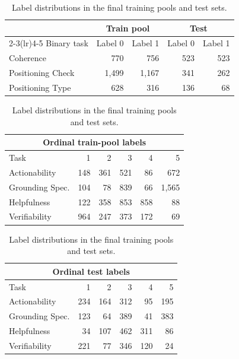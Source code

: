 \begin{table}[H]
\centering
\fontsize{9.5pt}{10.8pt}\selectfont
\renewcommand{\arraystretch}{0.92}
\setlength{\tabcolsep}{1.5pt}

\begin{tabular*}{\columnwidth}
  {@{\extracolsep{\fill}}lrrrr@{}}
\toprule
& \multicolumn{2}{c}{Train pool}
& \multicolumn{2}{c}{Test} \\
\cmidrule(lr){2-3}\cmidrule(lr){4-5}
Binary task & Label 0 & Label 1 & Label 0 & Label 1 \\
\midrule
Coherence & 770 & 756 & 523 & 523 \\
Positioning Check & 1,499 & 1,167 & 341 & 262 \\
Positioning Type & 628 & 316 & 136 & 68 \\
\bottomrule
\end{tabular*}

\vspace{3pt}
\begin{tabular*}{\columnwidth}
  {@{\extracolsep{\fill}}lrrrrr@{}}
\toprule
\multicolumn{6}{c}{\textbf{Ordinal train-pool labels}} \\
\midrule
Task & 1 & 2 & 3 & 4 & 5 \\
\midrule
Actionability & 148 & 361 & 521 & 86 & 672 \\
Grounding Spec. & 104 & 78 & 839 & 66 & 1,565 \\
Helpfulness & 122 & 358 & 853 & 858 & 88 \\
Verifiability & 964 & 247 & 373 & 172 & 69 \\
\bottomrule
\end{tabular*}

\vspace{3pt}
\begin{tabular*}{\columnwidth}
  {@{\extracolsep{\fill}}lrrrrr@{}}
\toprule
\multicolumn{6}{c}{\textbf{Ordinal test labels}} \\
\midrule
Task & 1 & 2 & 3 & 4 & 5 \\
\midrule
Actionability & 234 & 164 & 312 & 95 & 195 \\
Grounding Spec. & 123 & 64 & 389 & 41 & 383 \\
Helpfulness & 34 & 107 & 462 & 311 & 86 \\
Verifiability & 221 & 77 & 346 & 120 & 24 \\
\bottomrule
\end{tabular*}

\caption{Label distributions in the final training pools and test sets.}
\label{tab:data-label-distributions}
\end{table}

